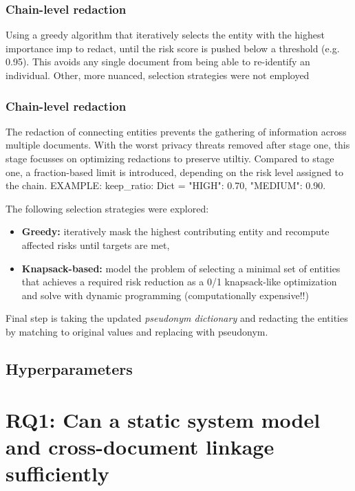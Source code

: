 \subsubsection{Chain-level redaction}




Using a greedy algorithm that iteratively selects the entity with the highest importance $\mathrm{imp}$ to redact, until the risk score is pushed below a threshold (e.g. 0.95). This avoids any single document from being able to re-identify an individual. Other, more nuanced, selection strategies were not employed %

\subsubsection{Chain-level redaction}
The redaction of connecting entities prevents the gathering of information across multiple documents. With the worst privacy threats removed after stage one, this stage focusses on optimizing redactions to preserve utiltiy. Compared to stage one, a fraction-based limit is introduced, depending on the risk level assigned to the chain. EXAMPLE: keep\_ratio: Dict = {"HIGH": 0.70, "MEDIUM": 0.90}. 

The following selection strategies were explored:
\begin{itemize}
\item \textbf{Greedy:} iteratively mask the highest contributing entity and recompute affected risks until targets are met,
\item \textbf{Knapsack-based:} model the problem of selecting a minimal set of entities that achieves a required risk reduction as a 0/1 knapsack-like optimization and solve with dynamic programming (computationally expensive!!)
\end{itemize}


Final step is taking the updated \textit{pseudonym dictionary} and redacting the entities by matching to original values and replacing with pseudonym. 


\subsection{Hyperparameters}
\section{RQ1: Can a static system model and cross-document linkage sufficiently}



